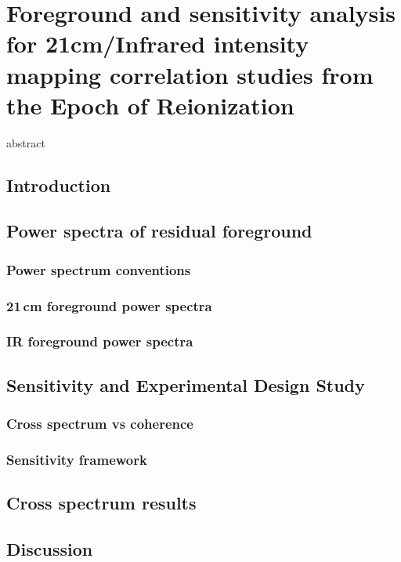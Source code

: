 \chapter{Foreground and sensitivity analysis for 21cm/Infrared intensity mapping correlation studies from the Epoch of Reionization}

abstract

\section{Introduction}

\section{Power spectra of residual foreground}
\subsection{Power spectrum conventions}
\subsection{21\,cm foreground power spectra}
\subsection{IR foreground power spectra}

\section{Sensitivity and Experimental Design Study}
\subsection{Cross spectrum vs coherence}
\subsection{Sensitivity framework}

\section{Cross spectrum results}

\section{Discussion}

